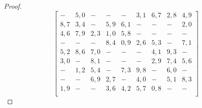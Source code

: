 \begin{proof}
\begin{equation}
  \begin{bmatrix}
    -  & 5,0 &  -  &  -  &  -  & 3,1 & 6,7 & 2,8 & 4,9 \\ 
   8,7 & 3,4 &  -  & 5,9 & 6,1 &  -  &  -  &  -  & 2,0 \\ 
   4,6 & 7,9 & 2,3 & 1,0 & 5,8 &  -  &  -  &  -  &  -  \\ 
    -  &  -  &  -  & 8,4 & 0,9 & 2,6 & 5,3 &  -  & 7,1 \\ 
   5,2 & 8,6 & 7,0 &  -  &  -  &  -  & 4,1 & 9,3 &  -  \\ 
   3,0 &  -  & 8,1 &  -  &  -  &  -  & 2,9 & 7,4 & 5,6 \\ 
    -  & 1,2 & 5,4 &  -  & 7,3 & 9,8 &  -  & 6,0 &  -  \\ 
    -  &  -  & 6,9 & 2,7 &  -  & 4,0 &  -  & 5,1 & 8,3 \\ 
   1,9 &  -  &  -  & 3,6 & 4,2 & 5,7 & 0,8 &  -  &  -  \\ 
  \end{bmatrix}
  \label{eq:order-ten}
\end{equation}


\end{proof}
